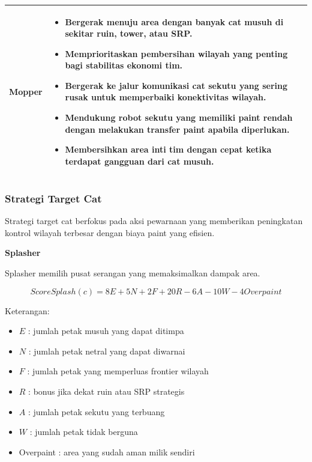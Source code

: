 \documentclass{article}
\begin{document}
\begin{longtable}{|p{}|p{}|}
Mopper &
\begin{itemize}[leftmargin=*, nosep]
    \item Bergerak menuju area dengan banyak cat musuh di sekitar ruin, tower, atau SRP.
\item Memprioritaskan pembersihan wilayah yang penting bagi stabilitas ekonomi tim.
\item Bergerak ke jalur komunikasi cat sekutu yang sering rusak untuk memperbaiki konektivitas wilayah.
\item Mendukung robot sekutu yang memiliki paint rendah dengan melakukan transfer paint apabila diperlukan.
\item Membersihkan area inti tim dengan cepat ketika terdapat gangguan dari cat musuh.
\end{itemize}
\\
\hline

\end{longtable}

\subsubsection{Strategi Target Cat}

Strategi target cat berfokus pada aksi pewarnaan yang memberikan peningkatan kontrol wilayah terbesar dengan biaya paint yang efisien.

\textbf{Splasher}

Splasher memilih pusat serangan yang memaksimalkan dampak area.

\[
ScoreSplash(c)
=
8E + 5N + 2F + 20R - 6A - 10W - 4Overpaint
\]

Keterangan:

\begin{itemize}
\item $E$ : jumlah petak musuh yang dapat ditimpa
\item $N$ : jumlah petak netral yang dapat diwarnai
\item $F$ : jumlah petak yang memperluas frontier wilayah
\item $R$ : bonus jika dekat ruin atau SRP strategis
\item $A$ : jumlah petak sekutu yang terbuang
\item $W$ : jumlah petak tidak berguna
\item Overpaint : area yang sudah aman milik sendiri
\end{itemize}
\end{document}
